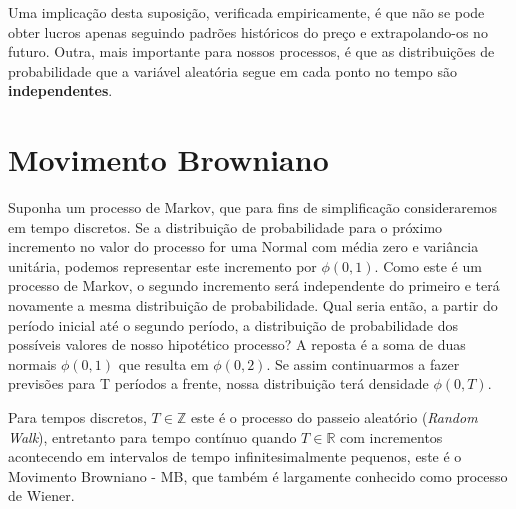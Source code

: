 \documentclass[]{book}
\theoremstyle{definition}
\theoremstyle{definition}
\theoremstyle{definition}
\theoremstyle{remark}
\begin{document}
Uma implicação desta suposição, verificada empiricamente, é que não se
pode obter lucros apenas seguindo padrões históricos do preço e
extrapolando-os no futuro. Outra, mais importante para nossos processos,
é que as distribuições de probabilidade que a variável aleatória segue
em cada ponto no tempo são \textbf{independentes}.

\section{Movimento Browniano}\label{mb}

Suponha um processo de Markov, que para fins de simplificação
consideraremos em tempo discretos. Se a distribuição de probabilidade
para o próximo incremento no valor do processo for uma Normal com média
zero e variância unitária, podemos representar este incremento por
\(\phi(0, 1)\). Como este é um processo de Markov, o segundo incremento
será independente do primeiro e terá novamente a mesma distribuição de
probabilidade. Qual seria então, a partir do período inicial até o
segundo período, a distribuição de probabilidade dos possíveis valores
de nosso hipotético processo? A reposta é a soma de duas normais
\(\phi(0, 1)\) que resulta em \(\phi(0, 2)\). Se assim continuarmos a
fazer previsões para T períodos a frente, nossa distribuição terá
densidade \(\phi(0, T)\).

Para tempos discretos, \(T\in\mathbb{Z}\) este é o processo do passeio
aleatório (\emph{Random Walk}), entretanto para tempo contínuo quando
\(T\in\mathbb{R}\) com incrementos acontecendo em intervalos de tempo
infinitesimalmente pequenos, este é o Movimento Browniano - MB, que
também é largamente conhecido como processo de Wiener.
\end{document}
